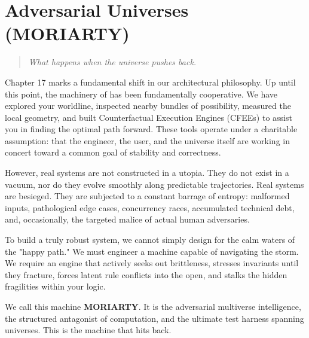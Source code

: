\chapter{Adversarial Universes (MORIARTY)}
\label{chapter-17-adversarial-universes}

\begin{quote}
\itshape
What happens when the universe pushes back.
\end{quote}

Chapter 17 marks a fundamental shift in our architectural philosophy. Up until this point, the machinery of \COMPUTER{} has been fundamentally cooperative. We have explored your worldline, inspected nearby bundles of possibility, measured the local geometry, and built Counterfactual Execution Engines (CFEEs) to assist you in finding the optimal path forward. These tools operate under a charitable assumption: that the engineer, the user, and the universe itself are working in concert toward a common goal of stability and correctness.

However, real systems are not constructed in a utopia. They do not exist in a vacuum, nor do they evolve smoothly along predictable trajectories. Real systems are besieged. They are subjected to a constant barrage of entropy: malformed inputs, pathological edge cases, concurrency races, accumulated technical debt, and, occasionally, the targeted malice of actual human adversaries.

To build a truly robust system, we cannot simply design for the calm waters of the "happy path." We must engineer a machine capable of navigating the storm. We require an engine that actively seeks out brittleness, stresses invariants until they fracture, forces latent rule conflicts into the open, and stalks the hidden fragilities within your logic.

We call this machine \textbf{MORIARTY}. It is the adversarial multiverse intelligence, the structured antagonist of computation, and the ultimate test harness spanning universes. This is the machine that hits back.

\makeatletter
{}
\makeatother

